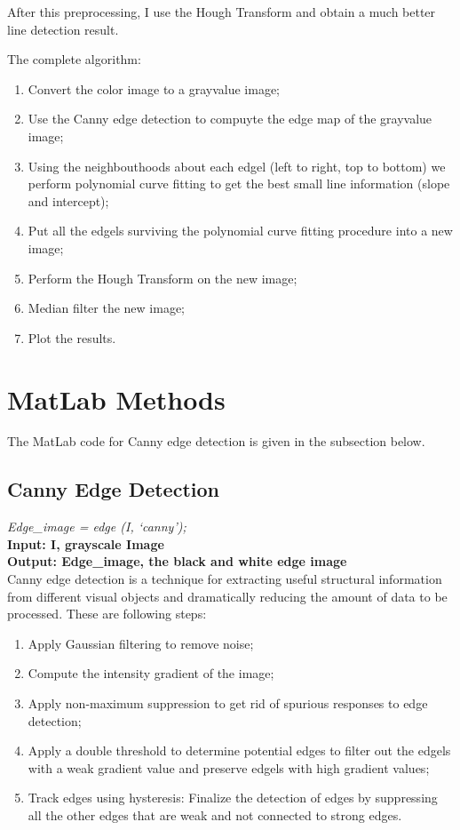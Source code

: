 After this preprocessing, I use the Hough Transform and obtain
a much better line detection result.

The complete algorithm:
\begin{enumerate}
    \item Convert the color image to a grayvalue image;
    \item Use the Canny edge detection to compuyte the edge map of the grayvalue image;
    \item Using the neighbouthoods about each edgel (left to right, top to bottom) 
          we perform polynomial curve fitting to get the best small line 
          information (slope and intercept);
    \item Put all the edgels surviving the polynomial curve fitting procedure 
          into a new image;
    \item Perform the Hough Transform on the new image;
    \item Median filter the new image;
    \item Plot the results.
\end{enumerate}

\section{MatLab Methods}

The MatLab code for Canny edge detection is given in the subsection below.

\subsection{Canny Edge Detection}
\vspace{3mm}
\textit{Edge\_image = edge (I, \lq{canny}\rq);}\\
\textbf{Input: I, grayscale Image}\\
\textbf{Output: Edge\_image, the black and white edge image}\\
\newline
Canny edge detection is a technique for extracting useful structural 
information from different visual objects and dramatically reducing 
the amount of data to be processed. These are following steps:
\begin{enumerate}
\item Apply Gaussian filtering to remove noise;
\item Compute the intensity gradient of the image;
\item Apply non-maximum suppression to get rid of spurious responses to edge detection;
\item Apply a double threshold to determine potential edges to filter out the 
edgels with a weak gradient value and preserve edgels with high gradient values;
\item Track edges using hysteresis: Finalize the detection of edges by suppressing 
all the other edges that are weak and not connected to strong edges.
\end{enumerate}


